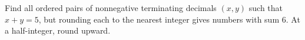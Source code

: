Find all ordered pairs of nonnegative terminating decimals $(x,y)$ such that $x+y=5$, but rounding each to the nearest integer gives numbers with sum $6$. At a half-integer, round upward.
